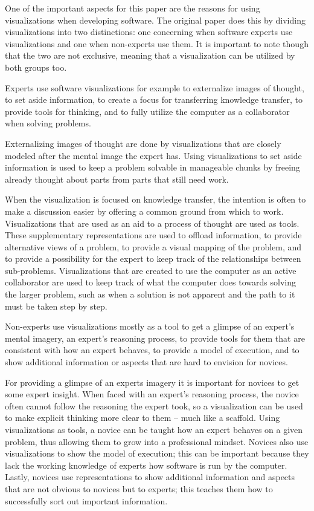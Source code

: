 \documentclass[11pt, a4paper, ngerman, twoside]{article}
\theoremstyle{plain}\newtheorem{Lemma}{Lemma}
\theoremstyle{plain}\newtheorem{Satz}[Lemma]{Satz}
\theoremstyle{definition}\newtheorem{Definition}[Lemma]{Definition}
\theoremstyle{definition}\newtheorem*{Beispiel}{Beispiel}
\theoremstyle{remark}\newtheorem*{Bemerkung}{Bemerkung}
\begin{document}
One of the important aspects for this paper are the reasons for using visualizations when developing software. The original paper does this by dividing visualizations into two distinctions: one concerning when software experts use visualizations and one when non-experts use them. It is important to note though that the two are not exclusive, meaning that a visualization can be utilized by both groups too.

Experts use software visualizations for example to externalize images of thought, to set aside information, to create a focus for transferring knowledge transfer, to provide tools for thinking, and to fully utilize the computer as a collaborator when solving problems.

Externalizing images of thought are done by visualizations that are closely modeled after the mental image the expert has. Using visualizations to set aside information is used to keep a problem solvable in manageable chunks by freeing already thought about parts from parts that still need work.

When the visualization is focused on knowledge transfer, the intention is often to make a discussion easier by offering a common ground from which to work. Visualizations that are used as an aid to a process of thought are used as tools. These supplementary representations are used to offload information, to provide alternative views of a problem, to provide a visual mapping of the problem, and to provide a possibility for the expert to keep track of the relationships between sub-problems. Visualizations that are created to use the computer as an active collaborator are used to keep track of what the computer does towards solving the larger problem, such as when a solution is not apparent and the path to it must be taken step by step.

Non-experts use visualizations mostly as a tool to get a glimpse of an expert's mental imagery, an expert's reasoning process, to provide tools for them that are consistent with how an expert behaves, to provide a model of execution, and to show additional information or aspects that are hard to envision for novices.

For providing a glimpse of an experts imagery it is important for novices to get some expert insight. When faced with an expert's reasoning process, the novice often cannot follow the reasoning the expert took, so a visualization can be used to make explicit thinking more clear to them – much like a scaffold. Using visualizations as tools, a novice can be taught how an expert behaves on a given problem, thus allowing them to grow into a professional mindset. Novices also use visualizations to show the model of execution; this can be important because they lack the working knowledge of experts how software is run by the computer. Lastly, novices use representations to show additional information and aspects that are not obvious to novices but to experts; this teaches them how to successfully sort out important information.
\end{document}
